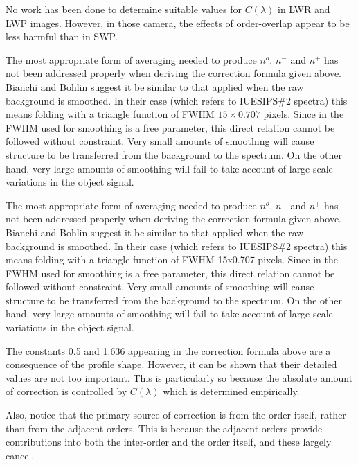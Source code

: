 No work has been done to determine suitable values for $C(\lambda)$ in LWR and
LWP images.  However, in those camera, the effects of order-overlap appear to
be less harmful than in SWP\@.

\begin{latexonly}
The most appropriate form of averaging needed to produce $n^{o}$,
$n^{-}$ and $n^{+}$ has not been addressed properly when deriving the
correction formula given above.  Bianchi and Bohlin suggest it be similar to
that applied when the raw background is smoothed.  In their case (which refers
to IUESIPS\#2 spectra) this means folding with a triangle function of FWHM
$15 \times 0.707$ pixels.  Since in 
 the FWHM used for smoothing is
a free parameter, this direct relation cannot be followed without constraint.
Very small amounts of smoothing will cause structure to be transferred from the
background to the spectrum.  On the other hand, very large amounts of smoothing
will fail to take account of large-scale variations in the object signal.
\end{latexonly}

\begin{htmlonly}
The most appropriate form of averaging needed to produce $n^{o}$,
$n^{-}$ and $n^{+}$ has not been addressed properly when deriving the
correction formula given above.  Bianchi and Bohlin suggest it be similar to
that applied when the raw background is smoothed.  In their case (which refers
to IUESIPS\#2 spectra) this means folding with a triangle function of FWHM
15x0.707 pixels.  Since in 
 the FWHM used for smoothing is
a free parameter, this direct relation cannot be followed without constraint.
Very small amounts of smoothing will cause structure to be transferred from the
background to the spectrum.  On the other hand, very large amounts of smoothing
will fail to take account of large-scale variations in the object signal.
\end{htmlonly}

The constants 0.5 and 1.636 appearing in the correction formula above
are a consequence of the profile shape.  However, it can be shown that their
detailed values are not too important.  This is particularly so because
the absolute amount of correction is controlled by $C(\lambda)$ which is
determined empirically.

Also, notice that the primary source of correction is from the order
itself, rather than from the adjacent orders.  This is because the adjacent
orders provide contributions into both the inter-order and the order itself,
and these largely cancel.

